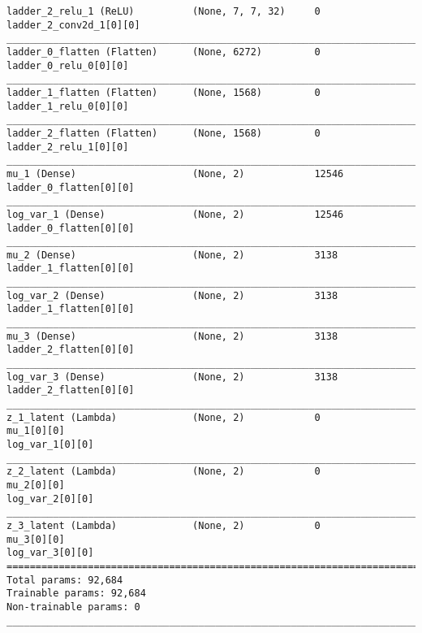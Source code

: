 \begin{lstlisting}[caption={\textsc{Mnist}-VLAE-factor-2 Encoder},captionpos=b,basicstyle=\tiny, label={lst:sparsity-vlae-encoder-28-fm2}]
ladder_2_relu_1 (ReLU)          (None, 7, 7, 32)     0           ladder_2_conv2d_1[0][0]
__________________________________________________________________________________________________
ladder_0_flatten (Flatten)      (None, 6272)         0           ladder_0_relu_0[0][0]
__________________________________________________________________________________________________
ladder_1_flatten (Flatten)      (None, 1568)         0           ladder_1_relu_0[0][0]
__________________________________________________________________________________________________
ladder_2_flatten (Flatten)      (None, 1568)         0           ladder_2_relu_1[0][0]
__________________________________________________________________________________________________
mu_1 (Dense)                    (None, 2)            12546       ladder_0_flatten[0][0]
__________________________________________________________________________________________________
log_var_1 (Dense)               (None, 2)            12546       ladder_0_flatten[0][0]
__________________________________________________________________________________________________
mu_2 (Dense)                    (None, 2)            3138        ladder_1_flatten[0][0]
__________________________________________________________________________________________________
log_var_2 (Dense)               (None, 2)            3138        ladder_1_flatten[0][0]
__________________________________________________________________________________________________
mu_3 (Dense)                    (None, 2)            3138        ladder_2_flatten[0][0]
__________________________________________________________________________________________________
log_var_3 (Dense)               (None, 2)            3138        ladder_2_flatten[0][0]
__________________________________________________________________________________________________
z_1_latent (Lambda)             (None, 2)            0           mu_1[0][0]
log_var_1[0][0]
__________________________________________________________________________________________________
z_2_latent (Lambda)             (None, 2)            0           mu_2[0][0]
log_var_2[0][0]
__________________________________________________________________________________________________
z_3_latent (Lambda)             (None, 2)            0           mu_3[0][0]
log_var_3[0][0]
==================================================================================================
Total params: 92,684
Trainable params: 92,684
Non-trainable params: 0
__________________________________________________________________________________________________
\end{lstlisting}